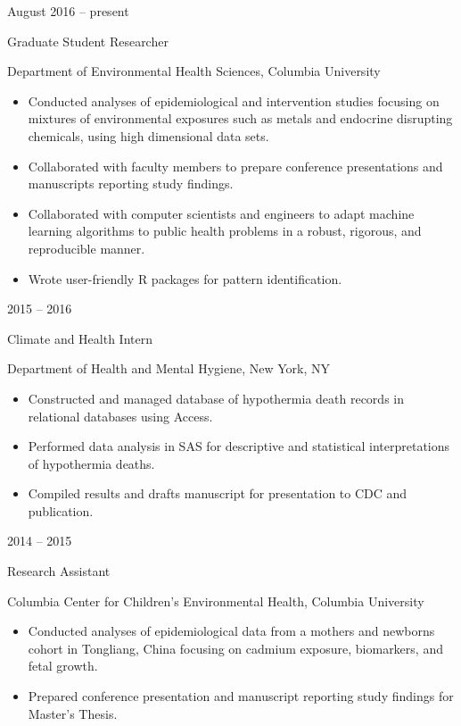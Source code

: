 \documentclass[a4paper,10pt]{article}
\newlength{\cvcolumngapwidth}
\newlength{\cvleftcolumnwidth}
\newlength{\cvrightcolumnwidth}
\newcommand{\cvtitlestyle}[1]{{\large\cvtitlefont\textcolor{cvtitlecolor}{#1}}}
\newcommand{\cvdurationstyle}[1]{{\small\cvdurationfont\textcolor{cvdurationcolor}{#1}}}
\newlength{\cvafteritemskipamount}
\newlength{\cvaftertitleskipamount}
\newlength{\cvparskip}
\newcommand{\cvitem}[2]{
    \begin{minipage}[t]{\cvleftcolumnwidth}
        \raggedleft #1
    \end{minipage}%
    \hspace{\cvcolumngapwidth}%
    \begin{minipage}[t]{\cvrightcolumnwidth}
        \setlength{\parskip}{\cvparskip} #2
    \end{minipage}

    \vspace{\cvafteritemskipamount}
}
\newcommand{\cvtitle}[1]{
    \cvtitlestyle{#1}

    \vspace{\cvaftertitleskipamount}
    \vspace{-\cvparskip}
}
\begin{document}
\cvitem{
    \cvdurationstyle{August 2016 -- present}
}{
    \cvtitle{Graduate Student Researcher}

    Department of Environmental Health Sciences, Columbia University

    \begin{itemize}[leftmargin=*]
        \item Conducted analyses of epidemiological and intervention studies focusing on mixtures of environmental exposures such as metals and endocrine disrupting chemicals, using high dimensional data sets.
        \item Collaborated with faculty members to prepare conference presentations and manuscripts reporting study findings.
        \item Collaborated with computer scientists and engineers to adapt machine learning algorithms to public health problems in a robust, rigorous, and reproducible manner.
        \item Wrote user-friendly R packages for pattern identification.
    \end{itemize}
}

\cvitem{
    \cvdurationstyle{2015 -- 2016}
}{
    \cvtitle{Climate and Health Intern}

    Department of Health and Mental Hygiene, New York, NY

    \begin{itemize}[leftmargin=*]
        \item Constructed and managed database of hypothermia death records in relational databases using Access.	\item Performed data analysis in SAS for descriptive and statistical interpretations of hypothermia deaths.
        \item Compiled results and drafts manuscript for presentation to CDC and publication.
    \end{itemize}
}

\cvitem{
    \cvdurationstyle{2014 -- 2015}
}{
    \cvtitle{Research Assistant}

    Columbia Center for Children's Environmental Health, Columbia University

    \begin{itemize}[leftmargin=*]
        \item Conducted analyses of epidemiological data from a mothers and newborns cohort in Tongliang, China focusing on cadmium exposure, biomarkers, and fetal growth.
 	\item Prepared conference presentation and manuscript reporting study findings for Master’s Thesis.
    \end{itemize}
}
\end{document}
